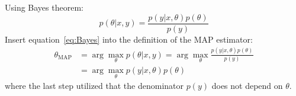 \begin{answer}

Using Bayes theorem:
\begin{equation}
    \label{eq:Bayes}
    p(\theta|x,y) = \frac{p(y|x, \theta)p(\theta)}{p(y)}
\end{equation}
Insert equation~\ref{eq:Bayes} into the definition of the MAP estimator:
\begin{align*}
  \theta_{\text{MAP}} &= \arg\max_\theta p(\theta|x,y) = \arg\max_\theta \frac{p(y|x, \theta)p(\theta)}{p(y)} \\
  &= \arg\max_\theta p(y|x, \theta)p(\theta)
\end{align*}
where the last step utilized that the denominator $p(y)$ does not depend on $\theta$.
\end{answer}
